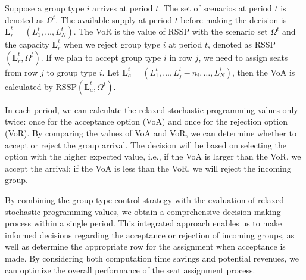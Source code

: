 Suppose a group type $i$ arrives at period $t$. The set of scenarios at period $t$ is denoted as $\Omega^{t}$. The available supply at period $t$ before making the decision is $\mathbf{L}_{r}^{t} = (L_1^{t}, \ldots, L_N^{t})$. The VoR is the value of RSSP with the scenario set $\Omega^{t}$ and the capacity $\mathbf{L}_{r}^{t}$ when we reject group type $i$ at period $t$, denoted as RSSP$(\mathbf{L}_{r}^{t}, \Omega^{t})$. If we plan to accept group type $i$ in row $j$, we need to assign seats from row $j$ to group type $i$. Let $\mathbf{L}_{a}^{t}= (L_1^{t}, \ldots, L_j^{t}-n_{i}, \ldots, L_N^{t})$, then the VoA is calculated by RSSP$(\mathbf{L}_{a}^{t}, \Omega^{t})$.

In each period, we can calculate the relaxed stochastic programming values only twice: once for the acceptance option (VoA) and once for the rejection option (VoR). By comparing the values of VoA and VoR, we can determine whether to accept or reject the group arrival. The decision will be based on selecting the option with the higher expected value, i.e., if the VoA is larger than the VoR, we accept the arrival; if the VoA is less than the VoR, we will reject the incoming group.



By combining the group-type control strategy with the evaluation of relaxed stochastic programming values, we obtain a comprehensive decision-making process within a single period. This integrated approach enables us to make informed decisions regarding the acceptance or rejection of incoming groups, as well as determine the appropriate row for the assignment when acceptance is made. By considering both computation time savings and potential revenues, we can optimize the overall performance of the seat assignment process.



